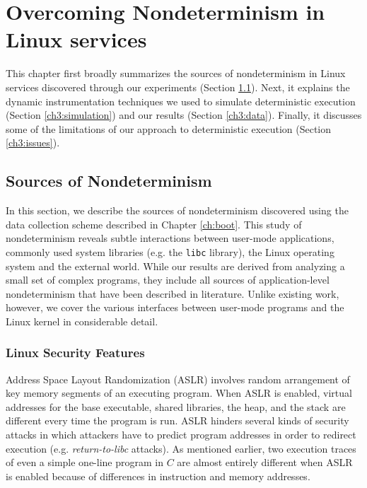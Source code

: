 \newenvironment{mylisting}
{\begin{list}{}{\setlength{\leftmargin}{1em}}\item\scriptsize\bfseries}
{\end{list}}

\chapter{Overcoming Nondeterminism in Linux services} \label{ch:src}
This chapter first broadly summarizes the sources of nondeterminism
in Linux services discovered through our experiments (Section \ref{ch3:sources}).
Next, it explains the dynamic instrumentation techniques
we used to simulate deterministic execution (Section \ref{ch3:simulation})
and our results (Section \ref{ch3:data}).
Finally, it discusses some of the limitations 
of our approach to deterministic execution (Section \ref{ch3:issues}).

\section{Sources of Nondeterminism} \label{ch3:sources}
In this section, we describe the sources of nondeterminism
discovered using the data collection scheme
described in Chapter \ref{ch:boot}.
This study of nondeterminism reveals
subtle interactions between user-mode
applications, commonly used system libraries (e.g. the \texttt{libc} library),
the Linux operating system and the external world.
While our results are derived from analyzing a small
set of complex programs, they include
all sources of application-level nondeterminism that 
have been described in literature. Unlike existing work,
however, we cover the various interfaces between user-mode programs
and the Linux kernel in considerable detail.

\subsection{Linux Security Features} \label{ch3:security}
 \newline
Address Space Layout Randomization (ASLR) involves random arrangement of
key memory segments of an executing program. When ASLR is enabled,
virtual addresses for the base executable, shared libraries, 
the heap, and the stack are different every time the program is run.
ASLR hinders several kinds of security attacks in which attackers have to predict
program addresses in order to redirect execution (e.g. \emph{return-to-libc} attacks). 
As mentioned earlier, two execution traces of even a
simple one-line program in $C$ are almost entirely different
when ASLR is enabled because of differences in
instruction and memory addresses. \newline

